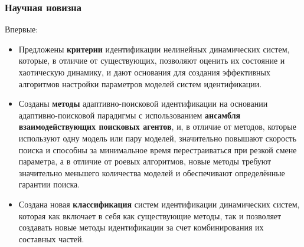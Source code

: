 \documentclass[14pt,handout,utf8]{beamer}
\begin{document}

\begin{frame}
  \frametitle{Научная новизна}

  \noindent
  Впервые:

  \begin{itemize}

    \item
      Предложены \textbf{критерии} идентификации нелинейных динамических систем, которые, в
      отличие от существующих, позволяют оценить их состояние и хаотическую динамику,
      и дают основания для создания эффективных алгоритмов настройки параметров
      моделей систем идентификации.

    \item
      Созданы \textbf{методы} адаптивно-поисковой идентификации на основании
      адаптивно-поисковой парадигмы с использованием \textbf{ансамбля взаимодействующих поисковых агентов},
      и, в отличие от методов, которые
      используют одну модель или пару моделей, значительно повышают скорость поиска и
      способны за минимальное время перестраиваться при резкой смене параметра, а в
      отличие от роевых алгоритмов, новые методы требуют значительно меньшего
      количества моделей и обеспечивают определённые гарантии поиска.

    \item
      Создана новая \textbf{классификация} систем идентификации динамических систем, которая
      как включает в себя как существующие методы, так и позволяет создавать новые методы
      идентификации за счет комбинирования их составных частей.

  \end{itemize}


\end{frame}




\end{document}
